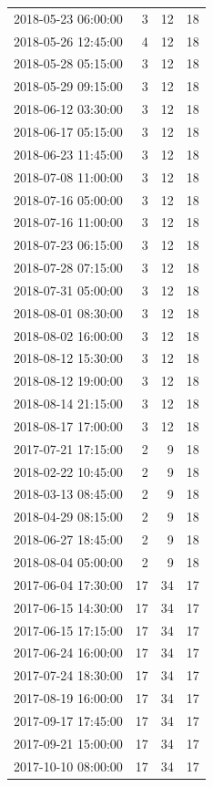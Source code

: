 \begin{tabular}{lrrr}
2018-05-23 06:00:00 & 3 & 12 & 18 \\
2018-05-26 12:45:00 & 4 & 12 & 18 \\
2018-05-28 05:15:00 & 3 & 12 & 18 \\
2018-05-29 09:15:00 & 3 & 12 & 18 \\
2018-06-12 03:30:00 & 3 & 12 & 18 \\
2018-06-17 05:15:00 & 3 & 12 & 18 \\
2018-06-23 11:45:00 & 3 & 12 & 18 \\
2018-07-08 11:00:00 & 3 & 12 & 18 \\
2018-07-16 05:00:00 & 3 & 12 & 18 \\
2018-07-16 11:00:00 & 3 & 12 & 18 \\
2018-07-23 06:15:00 & 3 & 12 & 18 \\
2018-07-28 07:15:00 & 3 & 12 & 18 \\
2018-07-31 05:00:00 & 3 & 12 & 18 \\
2018-08-01 08:30:00 & 3 & 12 & 18 \\
2018-08-02 16:00:00 & 3 & 12 & 18 \\
2018-08-12 15:30:00 & 3 & 12 & 18 \\
2018-08-12 19:00:00 & 3 & 12 & 18 \\
2018-08-14 21:15:00 & 3 & 12 & 18 \\
2018-08-17 17:00:00 & 3 & 12 & 18 \\
2017-07-21 17:15:00 & 2 & 9 & 18 \\
2018-02-22 10:45:00 & 2 & 9 & 18 \\
2018-03-13 08:45:00 & 2 & 9 & 18 \\
2018-04-29 08:15:00 & 2 & 9 & 18 \\
2018-06-27 18:45:00 & 2 & 9 & 18 \\
2018-08-04 05:00:00 & 2 & 9 & 18 \\
2017-06-04 17:30:00 & 17 & 34 & 17 \\
2017-06-15 14:30:00 & 17 & 34 & 17 \\
2017-06-15 17:15:00 & 17 & 34 & 17 \\
2017-06-24 16:00:00 & 17 & 34 & 17 \\
2017-07-24 18:30:00 & 17 & 34 & 17 \\
2017-08-19 16:00:00 & 17 & 34 & 17 \\
2017-09-17 17:45:00 & 17 & 34 & 17 \\
2017-09-21 15:00:00 & 17 & 34 & 17 \\
2017-10-10 08:00:00 & 17 & 34 & 17 \\

\end{tabular}
